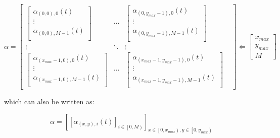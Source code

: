 \documentclass[./main.tex]{subfiles}
\begin{document}
        \begin{equation}
            \label{eq:ama}
            \alpha=
            \begin{bmatrix}
                \begin{bmatrix}
                    \alpha_{(0,0),0}(t)\\
                    \vdots\\
                    \alpha_{(0,0),M-1}(t)\\
                \end{bmatrix}&
                \cdots&
                \begin{bmatrix}
                    \alpha_{(0,y_{max}-1),0}(t)\\
                    \vdots\\
                    \alpha_{(0,y_{max}-1),M-1}(t)\\
                \end{bmatrix}&\\
                \vdots&\ddots&\vdots\\
                \begin{bmatrix}
                    \alpha_{(x_{max}-1,0),0}(t)\\
                    \vdots\\
                    \alpha_{(x_{max}-1,0),M-1}(t)\\
                \end{bmatrix}&
                \cdots&
                \begin{bmatrix}
                    \alpha_{(x_{max}-1,y_{max}-1),0}(t)\\
                    \vdots\\
                    \alpha_{(x_{max}-1,y_{max}-1),M-1}(t)\\
                \end{bmatrix}
            \end{bmatrix}\Leftarrow
            \begin{bmatrix}
                x_{max}\\
                y_{max}\\
                M
            \end{bmatrix}
        \end{equation}

        which can also be written as:

        \begin{equation}
            \label{eq:amao}
            \alpha = \left [ \left [ \alpha_{\left ( x,y \right ),i }\left ( t \right )  \right ]_{i \in \left[ 0,M \right)}  \right ]_{x \in \left[ 0,x_{max} \right), y \in \left[ 0,y_{max} \right) }
        \end{equation}
\end{document}

